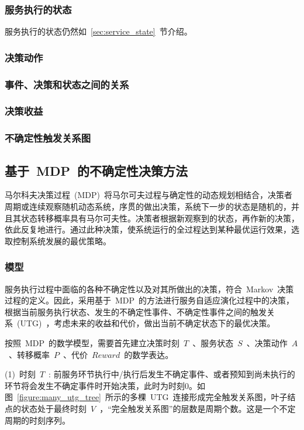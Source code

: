 \subsubsection{服务执行的状态}

服务执行的状态仍然如~\ref{sec:service_state}~节介绍。

\subsubsection{决策动作}

\subsubsection{事件、决策和状态之间的关系}

\subsubsection{决策收益}

\subsubsection{不确定性触发关系图}


\subsection{基于~MDP~的不确定性决策方法}
马尔科夫决策过程~(MDP)~将马尔可夫过程与确定性的动态规划相结合，决策者周期或连续观察随机动态系统，序贯的做出决策，系统下一步的状态是随机的，并且其状态转移概率具有马尔可夫性。决策者根据新观察到的状态，再作新的决策，依此反复地进行。通过此种决策，使系统运行的全过程达到某种最优运行效果，选取控制系统发展的最优策略。

\subsubsection{模型}

服务执行过程中面临的各种不确定性以及对其所做出的决策，符合~Markov~决策过程的定义。因此，采用基于~MDP~的方法进行服务自适应演化过程中的决策，根据当前服务执行状态、发生的不确定性事件、不确定性事件之间的触发关系~(UTG)~，考虑未来的收益和代价，做出当前不确定状态下的最优决策。

按照~MDP~的数学模型，需要首先建立决策时刻~$T$~、服务状态~$S$~、决策动作~$A$~、转移概率~$P$~、代价~$Reward$~的数学表达。

(1)~时刻~$T$~: 前服务环节执行中/执行后发生不确定事件、或者预知到尚未执行的环节将会发生不确定事件时开始决策，此时为时刻0。如图~\ref{figure:many_utg_tree}~所示的多棵~UTG~连接形成完全触发关系图，叶子结点的状态处于最终时刻~$V$~，“完全触发关系图”的层数是周期个数。这是一个不定周期的时刻序列。

